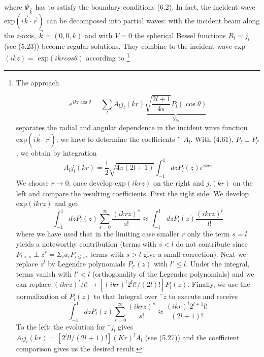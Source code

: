 where $\Psi_{\vec{k}}$ has to satisfy the boundary conditions (6.2). In fact, the incident wave exp$ (i \vec{k}\cdot\vec{r})$ can be decomposed into partial waves: with the incident beam along the $z$-axis, $\vec{k} = (0, 0, k)$ and with $V = 0$ the spherical Bessel functions $R_l = j_l$ (see (5.23)) become regular solutions. They combine to the incident wave exp$(ikz) =$ exp$(ikr cos \theta)$ according to \footnote{
The approach


\begin{equation}
    e^{i k r \cos \theta}=\sum_{l} A_{l} j_{l}(k r) \underbrace{\sqrt{\frac{2 l+1}{4 \pi}} P_{l}(\cos \theta)}_{Y_{l 0}}
    \end{equation}
separates the radial and angular dependence in the incident wave function exp$ (i\vec{k}\cdot\vec{r})$; we have to determine the coefficients ¨ $A_l$. With (4.61), $P_l \perp P_{l'}$, we obtain by integration
\begin{equation}
    A_{l} j_{l}(k r)=\frac{1}{2} \sqrt{4 \pi(2 l+1)} \int_{-1}^{1} d z P_{l}(z) e^{i k r z}
    \end{equation}
We choose $r \rightarrow 0$, once develop exp$ (ikrz)$ on the right and $j_l (kr)$ on the left and compare the resulting coefficients. First the right side: We develop exp$ (ikrz)$ and get
\begin{equation}
    \int_{-1}^{1} d z P_{l}(z) \sum_{s=0}^{\infty} \frac{(i k r z)^{s}}{s !} \approx \int_{-1}^{1} d z P_{l}(z) \frac{(i k r z)^{l}}{l !}
    \end{equation}
where we have used that in the limiting case smaller $r$ only the term $s = l$ yields a noteworthy contribution (terms with $s <l$ do not contribute since $P_{l <s} \perp z^s=\Sigma_i a_iP_{i\leq s}$, terms with $s> l$ give a small correction). Next we replace $z^l$ by Legendre polynomials $P_{l'}(z)$ with $l' ≤ l$. Under the integral, terms vanish with $l' <l$ (orthogonality of the Legendre polynomials) and we can replace $(ikrz)^l/l!\rightarrow[(ikr)^l 2^l l! / (2l)!] P_l (z)$. Finally, we use the normalization of $P_l (z)$ to that Integral over $¨z$ to execute and receive
\begin{equation}
    \int_{-1}^{1} d z P_{l}(z) \sum_{s=0}^{\infty} \frac{(i k r z)^{s}}{s !} \approx \frac{(i k r)^{l} 2^{l+1} l !}{(2 l+1) !}
    \end{equation}
To the left: the evolution for $¨j_l$ gives $A_l j_l (kr) = [2^l l! / (2l + 1)!] (Kr)^lA_l$ (see (5.27)) and the coefficient comparison gives us the desired result.
}
